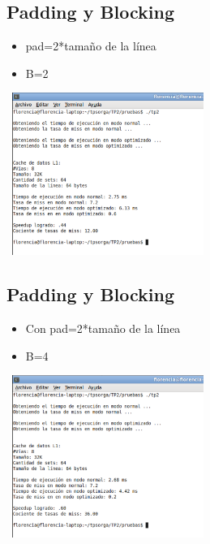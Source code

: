 \documentclass[a4paper,10pt]{article}
\begin{document}
\subsection*{Padding y Blocking}
\begin{itemize}
 \item pad=2*tama\~no de la l\'inea
 \item B=2
\end{itemize}

\begin{center}
 \includegraphics[width=250px,height=200px,bb=0 0 328 277,scale=1]{./ssh4.png}
\end{center}

\subsection*{Padding y Blocking}
\begin{itemize}
\item Con pad=2*tama\~no de la l\'inea
\item B=4
\end{itemize}
\begin{center}
 \includegraphics[width=250px,height=200px,bb=0 0 328 277,scale=1]{./ssh5.png}
\end{center}
\end{document}

